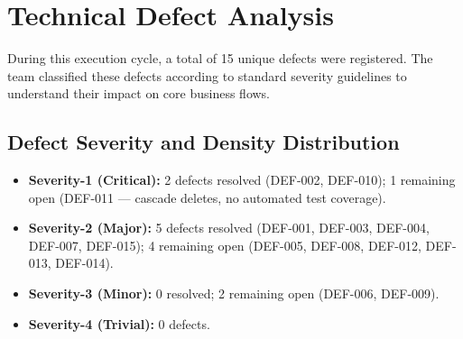 \documentclass[11pt,a4paper]{article}
\begin{document}
\newpage

\section{Technical Defect Analysis} \label{sec:failures}
During this execution cycle, a total of 15 unique defects were registered. The team classified these defects according to standard severity guidelines to understand their impact on core business flows.

\subsection{Defect Severity and Density Distribution}
\begin{itemize}[noitemsep]
    \item \textbf{Severity-1 (Critical):} 2 defects resolved (DEF-002, DEF-010); 1 remaining open (DEF-011 — cascade deletes, no automated test coverage).
    \item \textbf{Severity-2 (Major):} 5 defects resolved (DEF-001, DEF-003, DEF-004, DEF-007, DEF-015); 4 remaining open (DEF-005, DEF-008, DEF-012, DEF-013, DEF-014).
    \item \textbf{Severity-3 (Minor):} 0 resolved; 2 remaining open (DEF-006, DEF-009).
    \item \textbf{Severity-4 (Trivial):} 0 defects.
\end{itemize}
\end{document}

